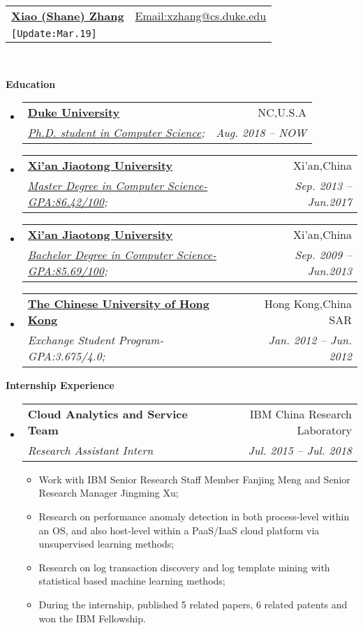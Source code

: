 \documentclass[letterpaper,11pt]{article}
\makeatletter
\newcommand{\resitem}[1]{\item #1 \vspace{-2pt}}
\newcommand{\resheading}[1]{{\large \colorbox{mygrey}{\begin{minipage}{\textwidth}{\textbf{#1 \vphantom{p\^{E}}}}\end{minipage}}}}
\newcommand{\ressubheading}[4]{
\begin{tabular*}{6.5in}{l@{\extracolsep{\fill}}r}
		\textbf{#1} & #2 \\
		\textit{#3} & \textit{#4} \\
\end{tabular*}\vspace{-6pt}}
\makeatother
\begin{document}
\newcommand{\mywebheader}{
\begin{tabular*}{7in}{l@{\extracolsep{\fill}}r}
	\textbf{\href{http://www.shane6.net/}{\LARGE Xiao (Shane) Zhang}} & \href{mailto:xzhang@cs.duke.edu}{Email:xzhang@cs.duke.edu}\\
	{\footnotesize \texttt{{[Update:Mar.19]}}}  \\
	\end{tabular*}
\\
\vspace{0.1in}}

\mywebheader

\resheading{Education}
	\begin{itemize}
		\item
			\ressubheading{\href{http://www.duke.edu}{Duke University}}{NC,U.S.A}{\href{http://www.cs.duke.edu}{Ph.D. student in Computer Science};}{Aug. 2018 -- NOW }
		\item
			\ressubheading{\href{http://www.xjtu.edu.cn}{Xi'an Jiaotong University}}{Xi'an,China}{\href{http://www.cs.xjtu.edu.cn}{Master Degree in Computer Science-GPA:86.42/100};}{Sep. 2013 -- Jun.2017 }
		\item
			\ressubheading{\href{http://www.xjtu.edu.cn}{Xi'an Jiaotong University}}{Xi'an,China}{\href{http://www.cs.xjtu.edu.cn}{Bachelor Degree in Computer Science-GPA:85.69/100};}{Sep. 2009 --  Jun.2013}
		\item
			\ressubheading{\href{http://www.cuhk.edu.hk}{The Chinese University of Hong Kong}}{Hong Kong,China SAR}{{Exchange Student Program-GPA:3.675/4.0};}{Jan. 2012 -- Jun. 2012}
	\end{itemize} %

\resheading{Internship Experience}
	\begin{itemize}
		\item 
			\ressubheading{Cloud Analytics and Service Team}{IBM China Research Laboratory}{Research Assistant Intern}{Jul. 2015 -- Jul. 2018}
				{ \footnotesize
				\begin{itemize}
					\resitem{Work with IBM Senior Research Staff Member Fanjing Meng and Senior Research Manager Jingming Xu;}
					\resitem{Research on performance anomaly detection in both process-level within an OS, and also host-level within a PaaS/IaaS cloud platform via unsupervised learning methods;}
					\resitem{Research on log transaction discovery and log template mining with statistical based machine learning methods;}
					\resitem{During the internship, published 5 related papers, 6 related patents and won the IBM Fellowship.}
				\end{itemize}
				}

	\end{itemize}
	
\end{document}
